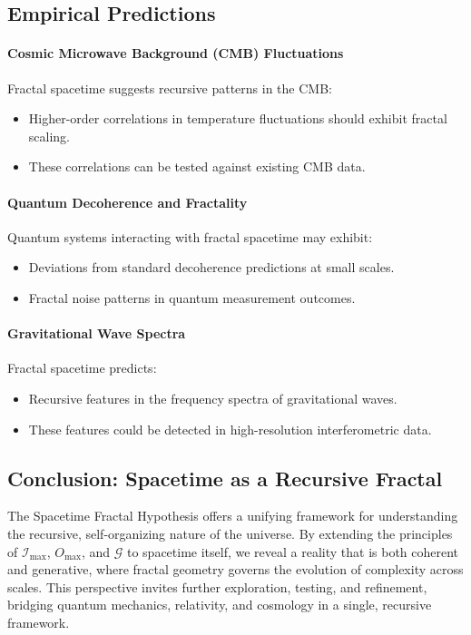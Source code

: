 \documentclass[12pt]{article}
\begin{document}
\subsection{Empirical Predictions}

\paragraph{Cosmic Microwave Background (CMB) Fluctuations}
Fractal spacetime suggests recursive patterns in the CMB:
\begin{itemize}
    \item Higher-order correlations in temperature fluctuations should exhibit fractal scaling.
    \item These correlations can be tested against existing CMB data.
\end{itemize}

\paragraph{Quantum Decoherence and Fractality}
Quantum systems interacting with fractal spacetime may exhibit:
\begin{itemize}
    \item Deviations from standard decoherence predictions at small scales.
    \item Fractal noise patterns in quantum measurement outcomes.
\end{itemize}

\paragraph{Gravitational Wave Spectra}
Fractal spacetime predicts:
\begin{itemize}
    \item Recursive features in the frequency spectra of gravitational waves.
    \item These features could be detected in high-resolution interferometric data.
\end{itemize}

\subsection{Conclusion: Spacetime as a Recursive Fractal}

The Spacetime Fractal Hypothesis offers a unifying framework for understanding the recursive, self-organizing nature of the universe. By extending the principles of \(\mathcal{I}_{\text{max}}\), \(O_{\text{max}}\), and \(\mathcal{G}\) to spacetime itself, we reveal a reality that is both coherent and generative, where fractal geometry governs the evolution of complexity across scales. This perspective invites further exploration, testing, and refinement, bridging quantum mechanics, relativity, and cosmology in a single, recursive framework.
\end{document}
